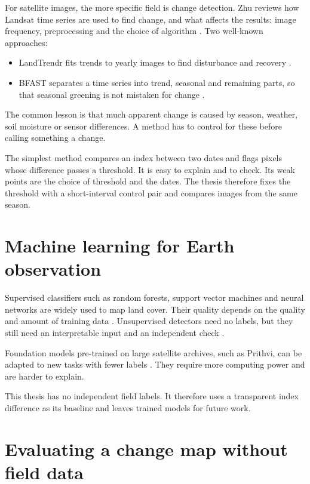 For satellite images, the more specific field is change detection. Zhu reviews how Landsat time series are used to find change, and what affects the results: image frequency, preprocessing and the choice of algorithm \cite{R240}. Two well-known approaches:

\begin{itemize}
  \item LandTrendr fits trends to yearly images to find disturbance and recovery \cite{R242}.
  \item BFAST separates a time series into trend, seasonal and remaining parts, so that seasonal greening is not mistaken for change \cite{R243}.

\end{itemize}
The common lesson is that much apparent change is caused by season, weather, soil moisture or sensor differences. A method has to control for these before calling something a change.

The simplest method compares an index between two dates and flags pixels whose difference passes a threshold. It is easy to explain and to check. Its weak points are the choice of threshold and the dates. The thesis therefore fixes the threshold with a short-interval control pair and compares images from the same season.

\section{Machine learning for Earth observation}

Supervised classifiers such as random forests, support vector machines and neural networks are widely used to map land cover. Their quality depends on the quality and amount of training data \cite{R245}. Unsupervised detectors need no labels, but they still need an interpretable input and an independent check \cite{R247}.

Foundation models pre-trained on large satellite archives, such as Prithvi, can be adapted to new tasks with fewer labels \cite{R204, R248}. They require more computing power and are harder to explain.

This thesis has no independent field labels. It therefore uses a transparent index difference as its baseline and leaves trained models for future work.

\section{Evaluating a change map without field data}

